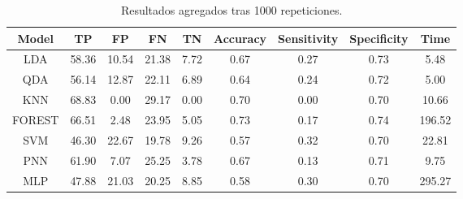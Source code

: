 \documentclass{article}
\begin{document}
\begin{table}[h!]
\centering
\begin{tabular}{|c|c|c|c|c|c|c|c|c|}
\hline
Model  & TP    & FP    & FN    & TN   & Accuracy & Sensitivity & Specificity & Time\\
\hline
   LDA & 58.36 & 10.54 & 21.38 & 7.72 &  0.67    & 0.27        & 0.73        & 5.48\\
   QDA & 56.14 & 12.87 & 22.11 & 6.89 &  0.64    & 0.24        & 0.72        & 5.00\\
   KNN & 68.83 & 0.00  & 29.17 & 0.00 &  0.70    & 0.00        & 0.70        & 10.66\\
FOREST & 66.51 & 2.48  & 23.95 & 5.05 &  0.73    & 0.17        & 0.74        & 196.52\\
   SVM & 46.30 & 22.67 & 19.78 & 9.26 &  0.57    & 0.32        & 0.70        & 22.81\\
   PNN & 61.90 & 7.07  & 25.25 & 3.78 &  0.67    & 0.13        & 0.71        & 9.75\\
   MLP & 47.88 & 21.03 & 20.25 & 8.85 &  0.58    & 0.30        & 0.70        & 295.27\\
\hline
\end{tabular}
\caption{Resultados agregados tras 1000 repeticiones.}
\label{table:}
\end{table}
\end{document}
